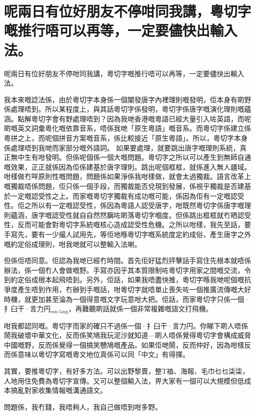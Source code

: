 \section{呢兩日有位好朋友不停咁同我講，粵切字嘅推行唔可以再等，一定要儘快出輸入法。}
呢兩日有位好朋友不停咁同我講，粵切字嘅推行唔可以再等，一定要儘快出輸入法。

我本來嘅諗法係，由於粵切字本身係一個闡發唐字內裡理則嘅發明，佢本身有啲野係處理唔到。所以某程度上，與其話粵切字係發明，粵切字係唐字嘅演化理則嘅蘊涵。點解粵切字會有野處理唔到？因為我哋香港嘅粵語已經大量引入咗英語，而呢啲嘅英文詞彙粵化嘅依靠音系，唔係我哋「原生粵語」嘅音系。而粵切字係建立係粵拼之上，而呢個拼音方案嘅音系，係比較接近「原生粵語」。所以，粵切字本身係處理唔到我哋而家部分嘅外語詞。
如果要處理，就要跳出唐字嘅理則系統，真正無中生有咁發明。但係呢個係一個大嘅問題。粵切字之所以可以產生到無師自通嘅效果，正正就係因為佢係建基於唐字理則。跳出呢個框框，就係進入無人疆域。咁樣做冇咩原則性嘅問題，問題係如果淨係我咁樣做，就會太過獨裁。語言改革上嘅獨裁唔係問題，佢只係一個手段，而獨裁能否兌現到發展，係視乎獨裁是否建基於一定嘅認受性之上。而家嘅粵切字獨裁有成功嘅可能，係因為佢有一定嘅認受性。佢之所以有一定嘅認受性，係因為粵語人認受唐字，咁既然粵切字係唐字嘅理則蘊涵，唐字嘅認受性就自自然然黐咗啲落粵切字嗰度。但係跳出框框就冇晒認受性，反而可能會對粵切字系統嘅核心造成認受性危機。之所以咁樣，我先至話，要手寫先，要有一少撮人試用先，等佢地喺粵切字嘅系統度定約成俗，產生唐字之外嘅約定俗成理則，咁我哋就可以整輸入法喇。

但係佢唔同意。佢認為我哋已經冇時間。首先佢好猛烈抨擊話手寫住先根本就唔係辦法，係一個冇人會做嘅野。手寫亦因乎其本質限制咗粵切字用家之間嘅交流，令到約定俗成根本起飛唔到。另外，佢話，如果我唔盡快推，粵切字喺我哋呢個嘅抗爭度產生唔到作用，冇辦到手嘅話，咁粵切字就唔單止喪失咗一個推廣流傳嘅大好時機，就更加甚至淪為一個得意嘅文字玩意咁大把。佢話，而家粵切字只係一個·扌臼干·言力円$_{\text{con lang}}$，再難聽啲話就係一個非常複雜嘅語文打飛機。

咁我都認同嘅。粵切字而家的確只不過係一個·扌臼干·言力円\textsubscript{}。你睇下啲人唔係鬧我破壞中華文化，反而係笑鳩我玩泥沙就知道—啲人唔係覺得粵切字會構成威脅中國嘅野，反而係覺得一個搞笑戇鳩嘅產品。如果佢哋鬧，反而仲好，因為咁樣反而係意味以粵切字寫嘅粵文地位真係可以同「中文」有得揮。

其實，要推粵切字，有好多方法。可以出野黎賣，整T裇、海報、毛巾乜乜柒柒，人地用住免費為粵切字宣傳。又可以整個輸入法，畀大家有一個可以大規模但低成本搞亂對家收集情報嘅溝通語文。

問題係，我冇錢，我唔夠人，我自己做唔到咁多野。

